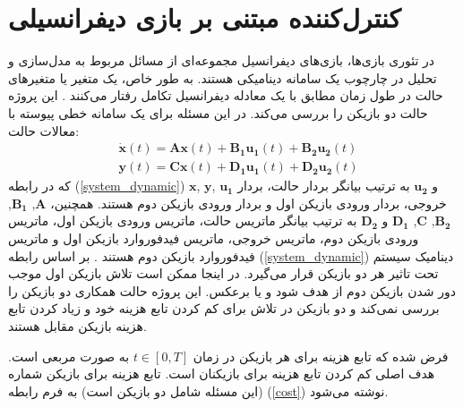 \chapter{کنترل‌کننده مبتنی بر بازی دیفرانسیلی}
در تئوری بازی‌ها، بازی‌های دیفرانسیل مجموعه‌ای از مسائل مربوط به مدل‌سازی و تحلیل در چارچوب یک سامانه دینامیکی هستند. به طور خاص، یک متغیر یا متغیرهای حالت در طول زمان مطابق با یک معادله دیفرانسیل تکامل رفتار می‌کنند
\cite{diff_game}.
 این پروژه حالت دو بازیکن را بررسی می‌کند. در این مسئله برای یک سامانه خطی پیوسته با معالات حالت:
 \begin{equation}\label{system_dynamic}
 	\begin{split}
 		 	&\boldsymbol{\dot x}(t) = \boldsymbol{Ax}(t) + \boldsymbol{B_1u_1}(t) + \boldsymbol{B_2u_2}(t)%
 		\\
 		&\boldsymbol{y}(t) = \boldsymbol{Cx}(t) + \boldsymbol{D_1u_1}(t) + \boldsymbol{D_2u_2}(t)
 	\end{split}
 \end{equation}
که در رابطه (\ref{system_dynamic})
$\boldsymbol x$, $\boldsymbol y$, $\boldsymbol{u_1}$
و
$\boldsymbol{u_2}$
به ترتیب بیانگر بردار حالت، بردار خروجی، بردار ورودی بازیکن اول و بردار ورودی بازیکن دوم هستند. همچنین، 
$\boldsymbol A$, $\boldsymbol{B_1}$, $\boldsymbol {B_2}$, $\boldsymbol C$, $\boldsymbol {D_1}$
و
$\boldsymbol{D_2}$
به ترتیب بیانگر ماتریس حالت، ماتریس ورودی بازیکن اول، ماتریس ورودی بازیکن دوم، ماتریس خروجی، ماتریس فیدفوروارد بازیکن اول و ماتریس فیدفوروارد بازیکن دوم هستند
\cite{mct}.
بر اساس رابطه (\ref{system_dynamic}) دینامیک سیستم تحت تاثیر هر دو بازیکن قرار می‌گیرد. در اینجا ممکن است تلاش  بازیکن اول موجب دور شدن بازیکن دوم از هدف شود و یا برعکس.  این پروژه حالت همکاری دو بازیکن را بررسی نمی‌کند و دو بازیکن در تلاش برای کم کردن تابع هزینه خود و زیاد کردن تابع هزینه بازیکن مقابل هستند.

 
  فرض شده  که تابع هزینه برای هر بازیکن در زمان $t \in [0, T]$ به صورت مربعی است.
  هدف اصلی کم کردن تابع هزینه برای بازیکنان است. تابع هزینه برای بازیکن شماره   (این مسئله شامل دو بازیکن است) به فرم رابطه (\ref{cost}) نوشته می‌شود.

